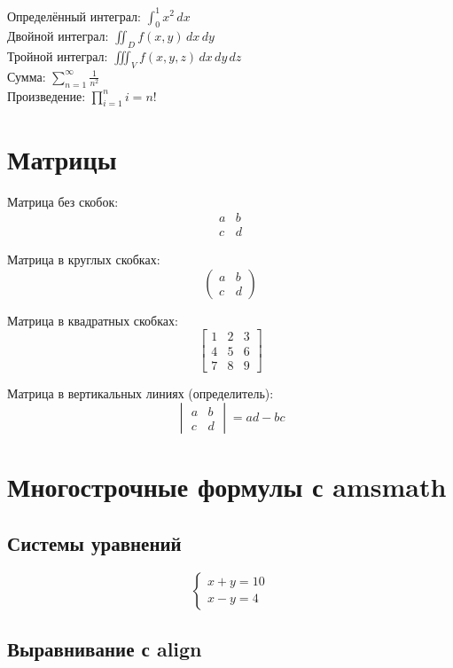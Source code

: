 \documentclass[a4paper,12pt]{article}
\begin{document}
Определённый интеграл: $\int_{0}^{1} x^2 \, dx$ \\
Двойной интеграл: $\iint_{D} f(x,y) \, dx \, dy$ \\
Тройной интеграл: $\iiint_{V} f(x,y,z) \, dx \, dy \, dz$ \\
Сумма: $\sum_{n=1}^{\infty} \frac{1}{n^2}$ \\
Произведение: $\prod_{i=1}^{n} i = n!$

\section{Матрицы}

Матрица без скобок:
\[
\begin{matrix}
a & b \\
c & d
\end{matrix}
\]

Матрица в круглых скобках:
\[
\begin{pmatrix}
a & b \\
c & d
\end{pmatrix}
\]

Матрица в квадратных скобках:
\[
\begin{bmatrix}
1 & 2 & 3 \\
4 & 5 & 6 \\
7 & 8 & 9
\end{bmatrix}
\]

Матрица в вертикальных линиях (определитель):
\[
\begin{vmatrix}
a & b \\
c & d
\end{vmatrix} = ad - bc
\]

\section{Многострочные формулы с amsmath}

\subsection{Системы уравнений}

\[
\begin{cases}
x + y = 10 \\
x - y = 4
\end{cases}
\]

\subsection{Выравнивание с align}
\end{document}
